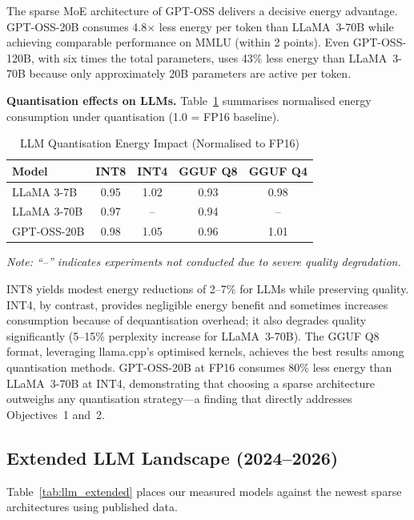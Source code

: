 \documentclass[AMS,STIX2COL]{WileyNJD-v2}
\begin{document}
The sparse MoE architecture of GPT-OSS delivers a decisive energy advantage. GPT-OSS-20B consumes 4.8$\times$ less energy per token than LLaMA~3-70B while achieving comparable performance on MMLU (within 2 points). Even GPT-OSS-120B, with six times the total parameters, uses 43\% less energy than LLaMA~3-70B because only approximately 20B parameters are active per token.

\textbf{Quantisation effects on LLMs.} Table~\ref{tab:llm_quant} summarises normalised energy consumption under quantisation (1.0 = FP16 baseline).

\begin{table}[h]
\caption{LLM Quantisation Energy Impact (Normalised to FP16)}\label{tab:llm_quant}
\centering
\begin{tabular}{lcccc}
\toprule
\textbf{Model} & \textbf{INT8} & \textbf{INT4} & \textbf{GGUF Q8} & \textbf{GGUF Q4} \\
\midrule
LLaMA 3-7B  & 0.95          & 1.02          & 0.93             & 0.98 \\
LLaMA 3-70B & 0.97          & --            & 0.94             & -- \\
GPT-OSS-20B & 0.98          & 1.05          & 0.96             & 1.01 \\
\bottomrule
\end{tabular}
\end{table}

\textit{Note: ``--'' indicates experiments not conducted due to severe quality degradation.}

INT8 yields modest energy reductions of 2--7\% for LLMs while preserving quality. INT4, by contrast, provides negligible energy benefit and sometimes increases consumption because of dequantisation overhead; it also degrades quality significantly (5--15\% perplexity increase for LLaMA~3-70B). The GGUF Q8 format, leveraging llama.cpp's optimised kernels, achieves the best results among quantisation methods. GPT-OSS-20B at FP16 consumes 80\% less energy than LLaMA~3-70B at INT4, demonstrating that choosing a sparse architecture outweighs any quantisation strategy---a finding that directly addresses Objectives~1 and~2.

\subsection{Extended LLM Landscape (2024--2026)}

Table~\ref{tab:llm_extended} places our measured models against the newest sparse architectures using published data.
\end{document}
